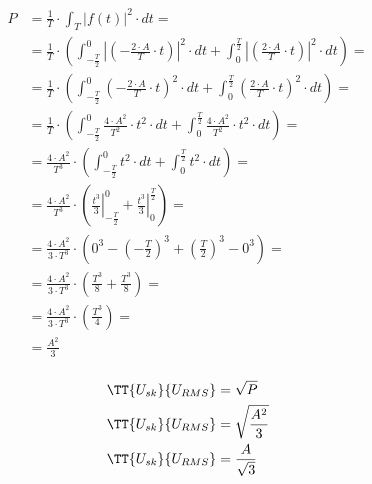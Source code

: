 \begin{task}

\begin{align*}
	P&=\frac{1}{T} \cdot \int_{T}\left|f(t)\right|^2 \cdot dt =\\
	&=\frac{1}{T} \cdot \left( \int_{-\frac{T}{2}}^{0}\left| \left(-\frac{2 \cdot A}{T} \cdot t \right) \right|^2 \cdot dt + \int_{0}^{\frac{T}{2}}\left| \left(\frac{2 \cdot A}{T} \cdot t \right) \right|^2 \cdot dt\right)=\\
	&=\frac{1}{T} \cdot \left( \int_{-\frac{T}{2}}^{0} \left(-\frac{2 \cdot A}{T} \cdot t \right)^2 \cdot dt + \int_{0}^{\frac{T}{2}}\left(\frac{2 \cdot A}{T} \cdot t \right)^2 \cdot dt\right)=\\
	&=\frac{1}{T} \cdot \left( \int_{-\frac{T}{2}}^{0}\frac{4 \cdot A^2}{T^2} \cdot t^2 \cdot dt + \int_{0}^{\frac{T}{2}} \frac{4 \cdot A^2}{T^2} \cdot t^2 \cdot dt\right)=\\
	&=\frac{4 \cdot A^2}{T^3} \cdot \left( \int_{-\frac{T}{2}}^{0} t^2 \cdot dt + \int_{0}^{\frac{T}{2}} t^2 \cdot dt\right)=\\
	&=\frac{4 \cdot A^2}{T^3} \cdot \left( \left. \frac{t^3}{3} \right|_{-\frac{T}{2}}^{0} +  \left. \frac{t^3}{3} \right|_{0}^{\frac{T}{2}} \right)=\\
	&=\frac{4 \cdot A^2}{3 \cdot T^3} \cdot \left( 0^3 - \left(-\frac{T}{2}\right)^3 + \left(\frac{T}{2}\right)^3 - 0^3 \right)=\\
	&=\frac{4 \cdot A^2}{3 \cdot T^3} \cdot \left( \frac{T^3}{8} + \frac{T^3}{8} \right)=\\
	&=\frac{4 \cdot A^2}{3 \cdot T^3} \cdot \left( \frac{T^3}{4} \right)=\\
	&=\frac{A^2}{3}\\
\end{align*}


\begin{equation}
\begin{aligned}
\TT{U_{sk}}{U_{RMS}}&=\sqrt{P}\\
\TT{U_{sk}}{U_{RMS}}&=\sqrt{\frac{A^2}{3}}	\\
\TT{U_{sk}}{U_{RMS}}&=\frac{A}{\sqrt{3}}	
\end{aligned}
\end{equation}


\end{task}